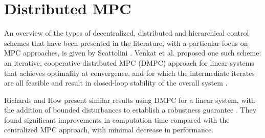 





\section{Distributed MPC}
\label{sec:lit:dmpc}

An overview of the types of decentralized, distributed and hierarchical control schemes that have been presented in the literature, with a particular focus on MPC approaches, is given by Scattolini \cite{Scattolini2009}.
Venkat et al. proposed one such scheme: an iterative, cooperative distributed MPC (DMPC) approach for linear systems that achieves optimality at convergence, and for which the intermediate iterates are all feasible and result in closed-loop stability of the overall system \cite{Venkat2005}.

Richards and How present similar results using DMPC for a linear system, with the addition of bounded disturbances to establish a robustness guarantee \cite{Trodden2007}.
They found significant improvements in computation time compared with the centralized MPC approach, with minimal decrease in performance.

